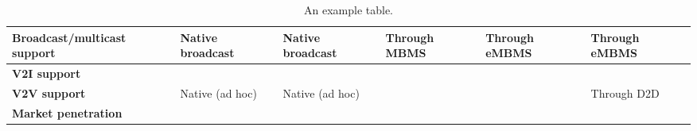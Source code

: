 \begin{table}[h!]
\begin{center}
\begin{tabulary}{\textwidth}{L|L|L|L|L|L}
	\bf{Broadcast/multicast support} & Native broadcast                                      & Native broadcast                                      & Through MBMS                     & Through eMBMS            & Through eMBMS             \\\hline
	\bf{V2I support}                 & \ok                                                   & \ok                                                   & \ok                              & \ok                      & \ok                       \\\hline
	\bf{V2V support}                 & Native (ad hoc)                                       & Native (ad hoc)                                       & \ko                              & \ko                      & Through D2D               \\\hline
	\bf{Market penetration}          & \ok                                                   & \ko                                                   & \ok                              & \ok                      & \ok                       \\\hline
	\end{tabulary}
	\caption{\label{tab:Tableppp} An example table.}
\end{center}
\end{table}

